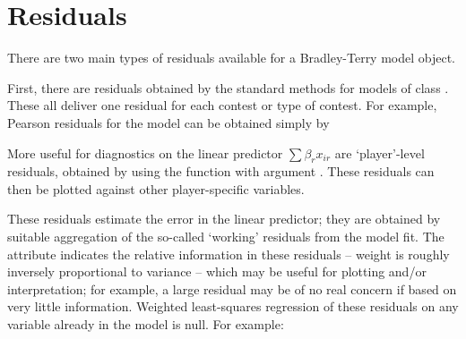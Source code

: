 \section{Residuals}
\label{sec:residuals}

There are two main types of residuals available for a Bradley-Terry model
object.

First, there are residuals obtained by the standard methods for models of class
.  These all deliver one residual for each contest or type of
contest.  For example, Pearson residuals for the model
 can be obtained simply by

\vspace*{0.2cm}

\Rcodeplaceholder{}


\vspace*{-0.2cm}

More useful for diagnostics on the linear predictor $\sum\beta_rx_{ir}$ are
`player'-level residuals, obtained by using the function 
with argument .  These residuals can then be
plotted against other player-specific variables.

\vspace*{-0.2cm}

\Rcodeplaceholder{}


\vspace*{-0.2cm}

These residuals estimate the error in the linear predictor; they are obtained by
suitable aggregation of the so-called `working' residuals from the model fit.
The  attribute
indicates the relative information in these residuals -- weight is roughly
inversely proportional to variance -- which may be useful for plotting and/or
interpretation; for example, a large residual may be of no real concern if based
on very little information. Weighted least-squares regression of these residuals
on any variable already in the model is null.
For example:

\vspace*{-0.2cm}

\Rcodeplaceholder{}


\vspace*{-0.2cm}

